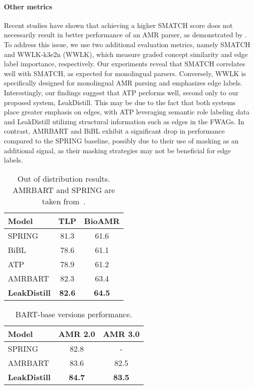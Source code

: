 \documentclass[11pt]{article}
\begin{document}
\paragraph{Other metrics} Recent studies have shown that achieving a higher SMATCH score does not necessarily result in better performance of an AMR parser, as demonstrated by \citet{opitz-frank-2022-better}. To address this issue, we use two additional evaluation metrics, namely SMATCH and WWLK-k3e2n (WWLK), which measure graded concept similarity and edge label importance, respectively. Our experiments reveal that SMATCH correlates well with SMATCH, as expected for monolingual parsers. Conversely, WWLK is specifically designed for monolingual AMR parsing and emphasizes edge labels. Interestingly, our findings suggest that ATP performs well, second only to our proposed system, LeakDistill. This may be due to the fact that both systems place greater emphasis on edges, with ATP leveraging semantic role labeling data and LeakDistill utilizing structural information such as edges in the FWAGs. In contrast, AMRBART and BiBL exhibit a significant drop in performance compared to the SPRING baseline, possibly due to their use of masking as an additional signal, as their masking strategies may not be beneficial for edge labels.


\begin{table}[t!]

\centering
\begin{tabular}{lcc}
\toprule
\textbf{Model} &  \textbf{TLP} &  \textbf{BioAMR} \\
\midrule
SPRING & 81.3 & 61.6 \\
BiBL & 78.6 & 61.1 \\
ATP & 78.9 & 61.2 \\
AMRBART & 82.3 & 63.4 \\
\textbf{LeakDistill} & \textbf{82.6} & \textbf{64.5} \\
 \bottomrule
\end{tabular}
\caption{Out of distribution results. AMRBART and SPRING are taken from~\citet{lee-etal-2022-maximum}.}
\label{table:OOD}
\end{table}


\begin{table}[t!]


\centering
\begin{tabular}{lcc}
\toprule
\textbf{Model} &  \textbf{AMR 2.0} &  \textbf{AMR 3.0} \\
\midrule
SPRING & 82.8 & - \\
AMRBART & 83.6 & 82.5 \\
\textbf{LeakDistill} & \textbf{84.7} & \textbf{83.5} \\
\bottomrule
\end{tabular}
\caption{BART-base versions performance.}
\label{table:bart-base}
\end{table}
\end{document}
